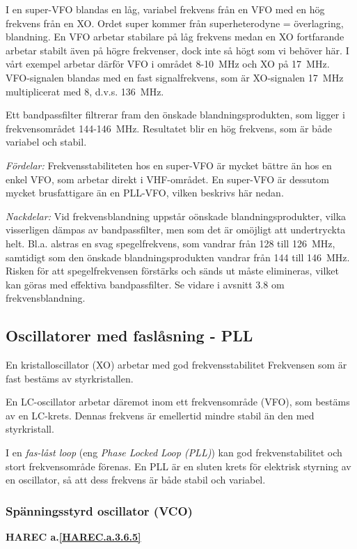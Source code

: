 I en super-VFO blandas en låg, variabel frekvens från en VFO med en
hög frekvens från en XO. Ordet super kommer från superheterodyne =
överlagring, blandning.  En VFO arbetar stabilare på låg frekvens
medan en XO fortfarande arbetar stabilt även på högre frekvenser, dock
inte så högt som vi behöver här. I vårt exempel arbetar därför VFO i
området 8-10~MHz och XO på 17~MHz. VFO-signalen blandas med en fast
signalfrekvens, som är XO-signalen 17~MHz multiplicerat med 8,
d.v.s. 136~MHz.

Ett bandpassfilter filtrerar fram den önskade blandningsprodukten, som
ligger i frekvensområdet 144-146~MHz. Resultatet blir en hög frekvens,
som är både variabel och stabil.

\emph{Fördelar:} Frekvensstabiliteten hos en super-VFO är mycket
bättre än hos en enkel VFO, som arbetar direkt i VHF-området. En
super-VFO är dessutom mycket brusfattigare än en PLL-VFO, vilken
beskrivs här nedan.

\emph{Nackdelar:} Vid frekvensblandning uppstår oönskade
blandningsprodukter, vilka visserligen dämpas av bandpassfilter, men
som det är omöjligt att undertryckta helt. Bl.a. alstras en svag
spegelfrekvens, som vandrar från 128 till 126~MHz, samtidigt som den
önskade blandningsprodukten vandrar från 144 till 146~MHz. Risken
för att spegelfrekvensen förstärks och sänds ut måste elimineras,
vilket kan göras med effektiva bandpassfilter. Se vidare i avsnitt 3.8
om frekvensblandning.

\subsection{Oscillatorer med faslåsning - PLL}

En kristalloscillator (XO) arbetar med god frekvensstabilitet
Frekvensen som är fast bestäms av styrkristallen.

En LC-oscillator arbetar däremot inom ett frekvensområde (VFO), som
bestäms av en LC-krets. Dennas frekvens är emellertid mindre stabil än
den med styrkristall.

I en \emph{fas-låst loop} (eng \emph{Phase Locked Loop (PLL)}) kan god
frekvenstabilitet och stort frekvensområde förenas. En PLL är en sluten krets
för elektrisk styrning av en oscillator, så att dess frekvens är både stabil och
variabel.

\subsubsection{Spänningsstyrd oscillator (VCO)}
\textbf{HAREC a.\ref{HAREC.a.3.6.5}\label{myHAREC.a.3.6.5}}

